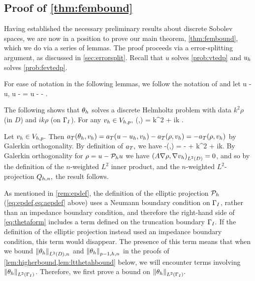 \subsection{Proof of \cref{thm:fembound}}\label{sec:fembound}

Having established the necessary preliminary results about discrete Sobolev spaces, we are now in a position to prove our main theorem, \cref{thm:fembound}, which we do via a series of lemmas. The proof proceeds via a error-splitting argument, as discussed in \cref{sec:errorsplit}. Recall that $u$ solves \cref{prob:vtedp} and $u_{h}$ solves \cref{prob:fevtedp}.

For ease of notation in the following lemmas, we follow the notation of \cite{DuWu:15} and let 
\beqs
\rho \de u - \Ph u, \tand
\eeqs
\beqs
\thetah \de \Ph u - \uh = u - \uh - \rho.
\eeqs


The following  shows that $\theta_{h}$ solves a discrete Helmholtz problem with data $k^2 \rho$ (in $D$) and $ik \rho$ (on $\Gamma_{I}$).
\label{lem:simpleform}
For any $v_{h} \in V_{h,p},$
\beq\label{eq:thetaform}
\aT(\thetah,\vh) = k^2\IPLtDn{\Qhn\rho}{\vh} + ik \IPLtGI{\rho}{\vh}.
\eeq
\ele

Let $v_{h} \in V_{h,p}.$ Then $a_{T}(\theta_{h},v_{h}) = a_{T}(u-u_{h},v_{h}) - a_{T}(\rho,v_{h}) = -a_{T}(\rho,v_{h})$ by Galerkin orthogonality. By definition of $a_{T},$ we have
\beqs
-\aT(\rho,\vh) = - + k^2  + ik\IPLtGI{\rho}{\vh}.
\eeqs
By Galerkin orthogonality for $\rho = u - \mathcal P_{h} u$ we have $\IPLtD{A\grad\rho}{\grad\vh} = 0$, and so by the definition of the $n$-weighted $L^2$ inner product, and the $n$-weighted $L^2$-projection $Q_{h,n},$ the result follows.
\epf

As mentioned in \cref{rem:epdef}, the definition of the elliptic projection $\mathcal P_{h}$ (\cref{eq:epdef,eq:aepdef} above) uses a Neumann boundary condition on $\Gamma_{I}$, rather than an impedance boundary condition, and therefore the right-hand side of \cref{eq:thetaform} includes a term defined on the truncation boundary $\Gamma_{I}.$ If the definition of the elliptic projection instead used an impedance boundary condition, this term would disappear. The presence of this term means that when we bound $\NLtDn{\thetah}$ and $\Npmohn{\thetah}$ in the proofs of \cref{lem:higherbound,lem:ltthetahbound} below, we will encounter terms involving $\NLtGI{\thetah}$. Therefore, we first prove a bound on $\NLtGI{\thetah}.$

